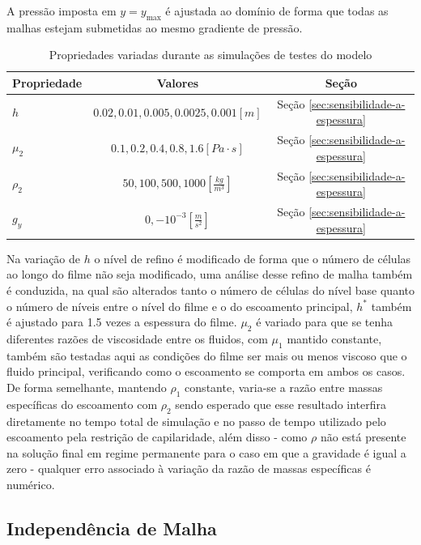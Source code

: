 A pressão imposta em $y = y_\mathrm{max}$ é ajustada ao domínio de forma que todas as malhas estejam submetidas ao mesmo gradiente de pressão.

\begin{table}
    \centering
    \caption{Propriedades variadas durante as simulações de testes do modelo}
    \label{tab:Variaveis-modificadas}
    \begin{tabular}{@{}l cc@{}}
        \toprule
        Propriedade     & Valores         & Seção \\
        \midrule
        $h$             & $0.02, 0.01, 0.005, 0.0025, 0.001 [m]$            & Seção \ref{sec:sensibilidade-a-espessura} \\
        $\mu_2$         & $0.1, 0.2, 0.4, 0.8, 1.6[Pa \cdot s]$             & Seção \ref{sec:sensibilidade-a-espessura} \\
        $\rho_2$        & $50, 100, 500, 1000 [\frac{kg}{m^3}]$             & Seção \ref{sec:sensibilidade-a-espessura} \\
        $g_y$           & $0, - 10^{-3} [\frac{m}{s^2}]$                  & Seção \ref{sec:sensibilidade-a-espessura} \\
        \bottomrule
    \end{tabular}
\end{table}

Na variação de $h$ o nível de refino é modificado de forma que o número de células ao longo do filme não seja modificado, uma análise desse refino de malha também é conduzida, na qual são alterados tanto o número de células do nível base quanto o número de níveis entre o nível do filme e o do escoamento principal, $h^*$ também é ajustado para 1.5 vezes a espessura do filme. $\mu_2$ é variado para que se tenha diferentes razões de viscosidade entre os fluidos, com $\mu_1$ mantido constante, também são testadas aqui as condições do filme ser mais ou menos viscoso que o fluido principal, verificando como o escoamento se comporta em ambos os casos. De forma semelhante, mantendo $\rho_1$ constante, varia-se a razão entre massas específicas do escoamento com $\rho_2$ sendo esperado que esse resultado interfira diretamente no tempo total de simulação e no passo de tempo utilizado pelo escoamento pela restrição de capilaridade, além disso - como $\rho$ não está presente na solução final em regime permanente para o caso em que a gravidade é igual a zero - qualquer erro associado à variação da razão de massas específicas é numérico.

\subsection{Independência de Malha}

